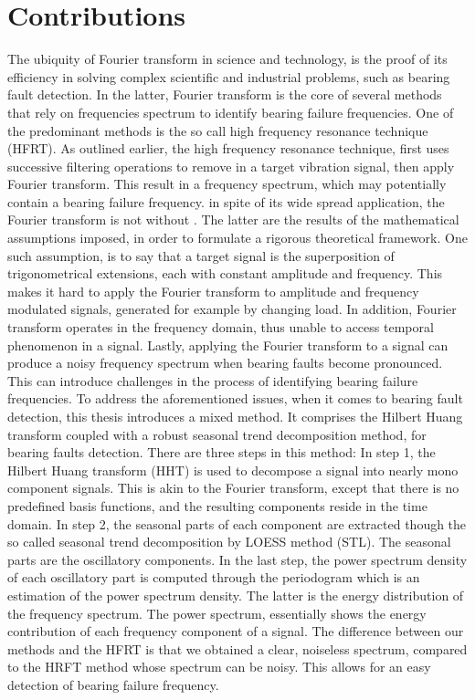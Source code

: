 \documentclass[../Main/thesis.tex]{subfiles}
\begin{document}
\section{Contributions }
\label{sec:contributions}
The ubiquity of Fourier transform in science and technology, is the proof of its efficiency in solving complex scientific and industrial problems, such as bearing fault detection. In the latter, Fourier transform is the core of several methods that rely on frequencies spectrum to identify bearing failure frequencies. One of the predominant methods is the so call high frequency resonance technique (HFRT). As outlined earlier, the high frequency resonance technique, first uses successive filtering operations to remove  in a target vibration signal, then apply Fourier transform. This result in a frequency spectrum, which may potentially contain a bearing failure frequency.
\justify
in spite of its wide spread application, the Fourier transform is not without . The latter are the results of the mathematical assumptions imposed, in order to formulate a rigorous theoretical framework. One such assumption, is to say that a target signal is the superposition of trigonometrical extensions, each with constant amplitude and frequency.
This makes it hard to apply the Fourier transform to amplitude and frequency modulated signals, generated for example by changing load. In addition, Fourier transform operates in the frequency domain, thus unable to access temporal phenomenon in a signal. Lastly, applying the Fourier transform to a signal can produce a noisy frequency spectrum when bearing faults become pronounced. This can introduce challenges in the process of identifying bearing failure frequencies.  
\justify
To address the aforementioned issues, when it comes to bearing fault detection, this thesis introduces a mixed method. It comprises the Hilbert Huang transform coupled with a robust seasonal trend decomposition method, for bearing faults detection. There are three steps in this method: In step 1, the Hilbert Huang transform (HHT) is used to decompose a signal into nearly mono component signals. This is akin to the Fourier transform, except that there is no predefined basis functions, and the resulting components reside in the time domain. In step 2, the seasonal parts of each component are extracted though the so called seasonal trend decomposition by LOESS method (STL). The seasonal parts are the oscillatory components. In the last step, the power spectrum density of each oscillatory part is computed through the periodogram which is an estimation of the power spectrum density. The latter is the energy distribution of the frequency spectrum. The power spectrum, essentially shows the energy contribution of each frequency component of a signal.
\justify
The difference between our methods and the HFRT is that we obtained a clear, noiseless spectrum, compared to the HRFT method whose spectrum can be noisy. This allows for an easy detection of bearing failure frequency.


\blankpage
\end{document}
